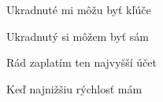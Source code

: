 \begin{song}
\bigskip

\Refren

\bigskip

Ukradnuté mi môžu byť kľúče \par
{}Ukradnutý si môžem byť sám \par
{}Rád zaplatím ten najvyšší účet \par
Keď najnižšiu rýchlosť mám \par

\bigskip

\Refren

\end{song}